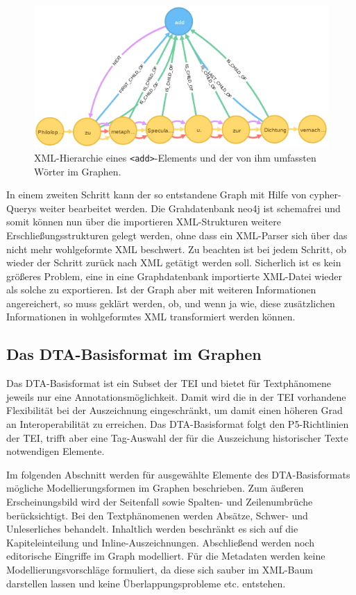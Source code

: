 \documentclass[12pt,ngerman,]{article}
\begin{document}
\begin{figure}
\centering
\includegraphics{Bilder/TEI2Graph/XML-Hierarchie.png}
\caption{XML-Hierarchie eines
\texttt{\textless{}add\textgreater{}}-Elements und der von ihm umfassten
Wörter im Graphen.}
\end{figure}

In einem zweiten Schritt kann der so entstandene Graph mit Hilfe von
cypher-Querys weiter bearbeitet werden. Die Grahdatenbank neo4j ist
schemafrei und somit können nun über die importieren XML-Strukturen
weitere Erschließungsstrukturen gelegt werden, ohne dass ein XML-Parser
sich über das nicht mehr wohlgeformte XML beschwert. Zu beachten ist bei
jedem Schritt, ob wieder der Schritt zurück nach XML getätigt werden
soll. Sicherlich ist es kein größeres Problem, eine in eine
Graphdatenbank importierte XML-Datei wieder als solche zu exportieren.
Ist der Graph aber mit weiteren Informationen angereichert, so muss
geklärt werden, ob, und wenn ja wie, diese zusätzlichen Informationen in
wohlgeformtes XML transformiert werden können.

\subsection{Das DTA-Basisformat im
Graphen}\label{das-dta-basisformat-im-graphen}

Das DTA-Basisformat ist ein Subset der TEI und bietet für Textphänomene
jeweils nur eine Annotationsmöglichkeit. Damit wird die in der TEI
vorhandene Flexibilität bei der Auszeichnung eingeschränkt, um damit
einen höheren Grad an Interoperabilität zu erreichen. Das
DTA-Basisformat folgt den P5-Richtlinien der TEI, trifft aber eine
Tag-Auswahl der für die Auszeichung historischer Texte notwendigen
Elemente.

Im folgenden Abschnitt werden für ausgewählte Elemente des
DTA-Basisformats mögliche Modellierungsformen im Graphen beschrieben.
Zum äußeren Erscheinungsbild wird der Seitenfall sowie Spalten- und
Zeilenumbrüche berücksichtigt. Bei den Textphänomenen werden Absätze,
Schwer- und Unleserliches behandelt. Inhaltlich werden beschränkt es
sich auf die Kapiteleinteilung und Inline-Auszeichnungen. Abschließend
werden noch editorische Eingriffe im Graph modelliert. Für die Metadaten
werden keine Modellierungsvorschläge formuliert, da diese sich sauber im
XML-Baum darstellen lassen und keine Überlappungsprobleme etc.
entstehen.
\end{document}
